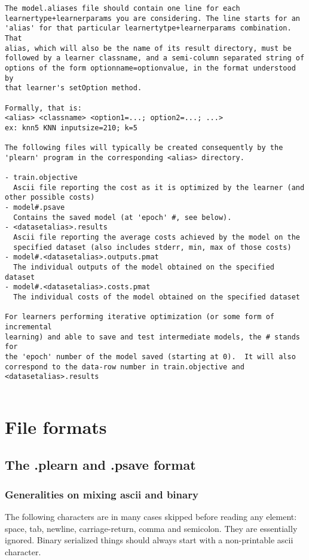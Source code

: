\documentclass[11pt]{book}
\begin{document}
\begin{verbatim}
The model.aliases file should contain one line for each
learnertype+learnerparams you are considering. The line starts for an
'alias' for that particular learnertytpe+learnerparams combination. That
alias, which will also be the name of its result directory, must be
followed by a learner classname, and a semi-column separated string of
options of the form optionname=optionvalue, in the format understood by
that learner's setOption method.

Formally, that is: 
<alias> <classname> <option1=...; option2=...; ...>
ex: knn5 KNN inputsize=210; k=5 

The following files will typically be created consequently by the 'plearn' program in the corresponding <alias> directory.

- train.objective   
  Ascii file reporting the cost as it is optimized by the learner (and other possible costs)
- model#.psave        
  Contains the saved model (at 'epoch' #, see below).
- <datasetalias>.results 
  Ascii file reporting the average costs achieved by the model on the 
  specified dataset (also includes stderr, min, max of those costs)
- model#.<datasetalias>.outputs.pmat 
  The individual outputs of the model obtained on the specified dataset
- model#.<datasetalias>.costs.pmat
  The individual costs of the model obtained on the specified dataset

For learners performing iterative optimization (or some form of incremental
learning) and able to save and test intermediate models, the # stands for
the 'epoch' number of the model saved (starting at 0).  It will also
correspond to the data-row number in train.objective and
<datasetalias>.results


\end{verbatim}


\chapter{File formats}

\section{The .plearn and .psave format}

\subsection{Generalities on mixing ascii and binary}

The following characters are in many cases skipped before reading any
element: space, tab, newline, carriage-return, comma and semicolon. They
are essentially ignored. Binary serialized things should always start with
a non-printable ascii character.
\end{document}

